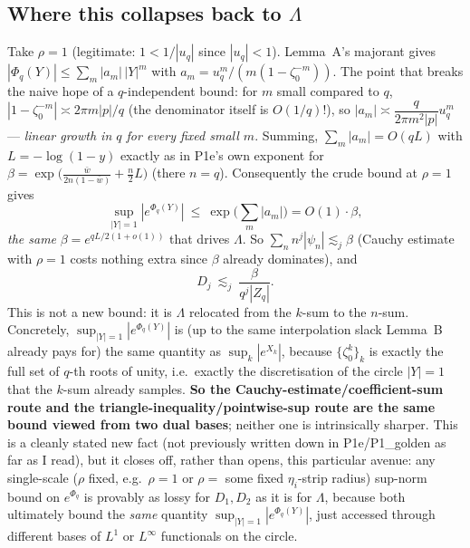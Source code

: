 \documentclass[11pt]{article}
\theoremstyle{remark}\newtheorem{remark}[theorem]{Remark}
\begin{document}
\subsection{Where this collapses back to $\Lambda$}
Take $\rho=1$ (legitimate: $1<1/|u_q|$ since $|u_q|<1$). Lemma~A's majorant gives $|\Phi_q(Y)|\le\sum_{m}|a_m|\,|Y|^m$ with $a_m=u_q^m/(m(1-\zeta_0^{-m}))$. The point that breaks the naive hope of a $q$-independent bound: for $m$ small compared to $q$, $|1-\zeta_0^{-m}|\asymp 2\pi m|p|/q$ (the denominator itself is $O(1/q)$!), so $|a_m|\asymp \dfrac{q}{2\pi m^2|p|}u_q^m$ --- \emph{linear growth in $q$ for every fixed small $m$}. Summing, $\sum_m|a_m|=O(qL)$ with $L=-\log(1-y)$ exactly as in P1e's own exponent for $\beta=\exp\!\big(\tfrac{\bar w}{2n(1-\bar w)}+\tfrac n2L\big)$ (there $n=q$). Consequently the crude bound at $\rho=1$ gives
\[
\sup_{|Y|=1}|e^{\Phi_q(Y)}|\ \le\ \exp\Big(\sum_m|a_m|\Big)=O(1)\cdot\beta,
\]
\emph{the same} $\beta=e^{qL/2(1+o(1))}$ that drives $\Lambda$. So $\sum_n n^j|\psi_n|\lesssim_j \beta$ (Cauchy estimate with $\rho=1$ costs nothing extra since $\beta$ already dominates), and
\[
D_j\ \lesssim_j\ \frac{\beta}{q^j|Z_q|}.
\]
This is not a new bound: it is $\Lambda$ relocated from the $k$-sum to the $n$-sum. Concretely, $\sup_{|Y|=1}|e^{\Phi_q(Y)}|$ is (up to the same interpolation slack Lemma~B already pays for) the same quantity as $\sup_k|e^{X_k}|$, because $\{\zeta_0^k\}_{k}$ is exactly the full set of $q$-th roots of unity, i.e.\ exactly the discretisation of the circle $|Y|=1$ that the $k$-sum already samples. \textbf{So the Cauchy-estimate/coefficient-sum route and the triangle-inequality/pointwise-sup route are the same bound viewed from two dual bases}; neither one is intrinsically sharper. This is a cleanly stated new fact (not previously written down in P1e/P1\_golden as far as I read), but it closes off, rather than opens, this particular avenue: any single-scale ($\rho$ fixed, e.g.\ $\rho=1$ or $\rho=$ some fixed $\eta_i$-strip radius) sup-norm bound on $e^{\Phi_q}$ is provably as lossy for $D_1,D_2$ as it is for $\Lambda$, because both ultimately bound the \emph{same} quantity $\sup_{|Y|=1}|e^{\Phi_q(Y)}|$, just accessed through different bases of $L^1$ or $L^\infty$ functionals on the circle.
\end{document}
